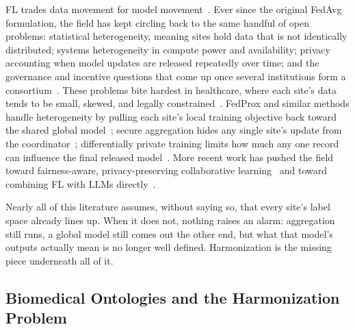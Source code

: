 \documentclass[conference]{IEEEtran}
\begin{document}
FL trades data movement for model movement~\cite{b3}. Ever since the original FedAvg formulation, the field has kept circling back to the same handful of open problems: statistical heterogeneity, meaning sites hold data that is not identically distributed; systems heterogeneity in compute power and availability; privacy accounting when model updates are released repeatedly over time; and the governance and incentive questions that come up once several institutions form a consortium~\cite{b2,b4}. These problems bite hardest in healthcare, where each site's data tends to be small, skewed, and legally constrained~\cite{b5}. FedProx and similar methods handle heterogeneity by pulling each site's local training objective back toward the shared global model~\cite{b27}; secure aggregation hides any single site's update from the coordinator~\cite{b26}; differentially private training limits how much any one record can influence the final released model~\cite{b24,b25}. More recent work has pushed the field toward fairness-aware, privacy-preserving collaborative learning~\cite{b6} and toward combining FL with LLMs directly~\cite{b36}.

Nearly all of this literature assumes, without saying so, that every site's label space already lines up. When it does not, nothing raises an alarm: aggregation still runs, a global model still comes out the other end, but what that model's outputs actually mean is no longer well defined. Harmonization is the missing piece underneath all of it.

\subsection{Biomedical Ontologies and the Harmonization Problem}
\end{document}
